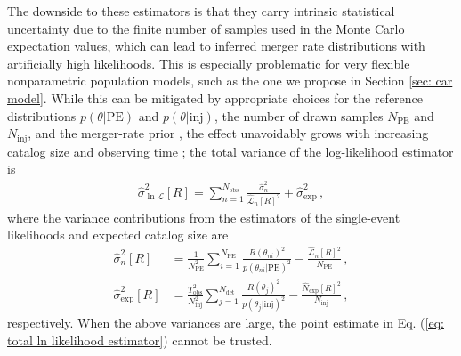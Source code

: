 \documentclass[%
reprint,
 amsmath,amssymb,
 aps,
 prd,nofootinbib,nobibnotes,
 superscriptaddress,groupedaddress,
]{revtex4-2}
\begin{document}
The downside to these estimators is that they carry intrinsic statistical uncertainty due to the finite number of samples used in the Monte Carlo expectation values, which can lead to inferred merger rate distributions with artificially high likelihoods. This is especially problematic for very flexible nonparametric population models, such as the one we propose in Section \ref{sec: car model}. While this can be mitigated by appropriate choices for the reference distributions $p(\theta|\mathrm{PE})$ and $p(\theta|\mathrm{inj})$, the number of drawn samples $N_\mathrm{PE}$ and $N_\mathrm{inj}$, and the merger-rate prior \cite{Essick:2022ojx}, the effect unavoidably grows with increasing catalog size and observing time \cite{Talbot:2023pex}; the total variance of the log-likelihood estimator is
\begin{align}
\hat{\sigma}_{\ln \mathcal{L}}^2 [R]
=
\sum_{n=1}^{N_\mathrm{obs}}
\frac{ \hat{\sigma}_n^2 }{ \hat{\mathcal{L}}_n[R]^2 }
+
\hat{\sigma}_\mathrm{exp}^2
\, ,
\label{eq: likelihood variance}
\end{align}
where the variance contributions from the estimators of the single-event likelihoods and expected catalog size are
\begin{align}
\hat{\sigma}_n^2 [R]
& =
\frac{ 1 }{ N_\mathrm{PE}^2 }
\sum_{i=1}^{N_\mathrm{PE}}
\frac{ R(\theta_{ni})^2 }{ p(\theta_{ni} | \mathrm{PE} )^2 }
-
\frac{ \hat{\mathcal{L}}_n[R]^2 }{ N_\mathrm{PE} }
\, ,
\\
\hat{\sigma}_\mathrm{exp}^2 [R]
& =
\frac{ T_\mathrm{obs}^2 }{ N_\mathrm{inj}^2 }
\sum_{j=1}^{N_\mathrm{det}}
\frac{ R(\theta_j)^2 }{ p(\theta_j|\mathrm{inj})^2 }
-
\frac{ \hat{N}_\mathrm{exp}[R]^2 }{ N_\mathrm{inj} }
\, , 
\label{eq: variance terms}
\end{align}
respectively. When the above variances are large, the point estimate in Eq. (\ref{eq: total ln likelihood estimator}) cannot be trusted.
\end{document}
